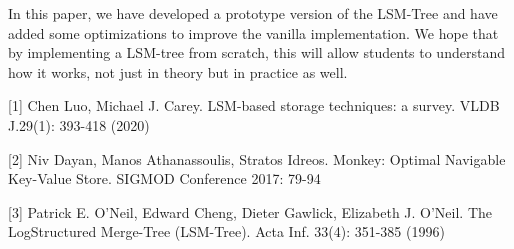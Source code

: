 \documentclass[sigconf]{acmart}
\begin{document}
    In this paper, we have developed a prototype version of the LSM-Tree and have added some optimizations to improve the vanilla implementation. We hope that by implementing a LSM-tree from scratch, this will allow students to understand how it works, not just in theory but in practice as well.

        {
        
        

        [1] Chen Luo, Michael J. Carey. LSM-based storage techniques: a survey. VLDB J.29(1): 393-418 (2020)

        [2] Niv Dayan, Manos Athanassoulis, Stratos Idreos. Monkey: Optimal Navigable
        Key-Value Store. SIGMOD Conference 2017: 79-94

        [3] Patrick E. O'Neil, Edward Cheng, Dieter Gawlick, Elizabeth J. O'Neil. The LogStructured Merge-Tree (LSM-Tree). Acta Inf. 33(4): 351-385 (1996)
    }
\end{document}
